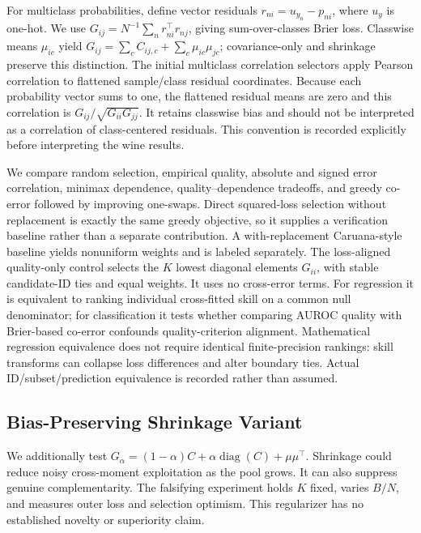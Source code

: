For multiclass probabilities, define vector residuals $r_{ni}=u_{y_n}-p_{ni}$,
where $u_y$ is one-hot. We use $G_{ij}=N^{-1}\sum_n r_{ni}^\top r_{nj}$,
giving sum-over-classes Brier loss. Classwise means $\mu_{ic}$ yield
$G_{ij}=\sum_c C_{ij,c}+\sum_c\mu_{ic}\mu_{jc}$; covariance-only and
shrinkage preserve this distinction. The initial multiclass correlation selectors
apply Pearson correlation to flattened sample/class residual coordinates.
Because each probability vector sums to one, the flattened residual means are
zero and this correlation is $G_{ij}/\sqrt{G_{ii}G_{jj}}$. It retains classwise
bias and should not be interpreted as a correlation of class-centered residuals.
This convention is recorded explicitly before interpreting the wine results.

We compare random selection, empirical quality, absolute and signed error
correlation, minimax dependence, quality--dependence tradeoffs, and greedy
co-error followed by improving one-swaps. Direct squared-loss selection without
replacement is exactly the same greedy objective, so it supplies a verification
baseline rather than a separate contribution. A with-replacement Caruana-style
baseline yields nonuniform weights and is labeled separately.
The loss-aligned quality-only control selects the $K$ lowest diagonal elements
$G_{ii}$, with stable candidate-ID ties and equal weights. It uses no cross-error
terms. For regression it is equivalent to ranking individual cross-fitted skill
on a common null denominator; for classification it tests whether comparing
AUROC quality with Brier-based co-error confounds quality-criterion alignment.
Mathematical regression equivalence does not require identical finite-precision
rankings: skill transforms can collapse loss differences and alter boundary ties.
Actual ID/subset/prediction equivalence is recorded rather than assumed.

\subsection{Bias-Preserving Shrinkage Variant}
We additionally test $G_\alpha=(1-\alpha)C+\alpha\operatorname{diag}(C)+\mu\mu^\top$.
Shrinkage could reduce noisy cross-moment exploitation as the pool grows. It can
also suppress genuine complementarity. The falsifying experiment holds $K$ fixed,
varies $B/N$, and measures outer loss and selection optimism. This regularizer
has no established novelty or superiority claim.

